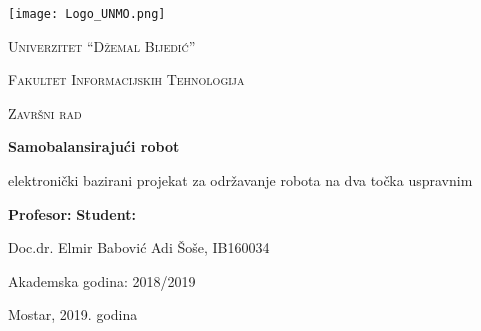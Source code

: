 \documentclass[../Document.tex]{subfiles}
\begin{document}
\begin{titlepage}
    \centering
    \texttt{[image: Logo\_UNMO.png]}\par
    \vspace{1cm}
    {\scshape\LARGE Univerzitet ``Džemal Bijedić'' \par}
    {\scshape\Large Fakultet Informacijskih Tehnologija \par}

    \vspace{2.5cm}
    {\scshape\Large Završni rad\par}
    \vspace{0.7cm}

    {\huge\bfseries Samobalansirajući robot\par}
    \vspace{0.5cm}
    elektronički bazirani projekat za održavanje robota na dva točka uspravnim\par

    \vfill

    \textbf{Profesor:}
    \hfill
    \textbf{{Student:}}\par
    Doc.dr. Elmir Babović
    \hfill
    Adi Šoše, IB160034\par

    \vspace{1cm}
    Akademska godina: 2018/2019\par
    \vspace{0.3cm}
    Mostar, 2019. godina
\end{titlepage}
\restoregeometry
\end{document}
